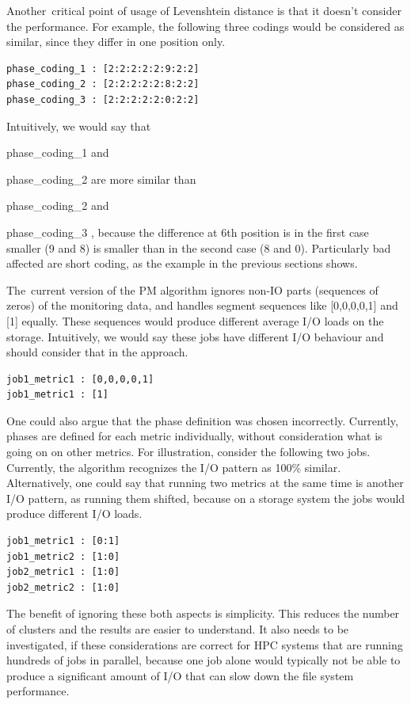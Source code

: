 \documentclass[]{llncs}
\begin{document}
Another\ critical point of usage of Levenshtein distance is that it doesn't consider the performance.
For example, the following three codings would be considered as similar, since they differ in one position only.

\begin{lstlisting}
phase_coding_1 : [2:2:2:2:2:9:2:2]
phase_coding_2 : [2:2:2:2:2:8:2:2]
phase_coding_3 : [2:2:2:2:2:0:2:2]
\end{lstlisting}

Intuitively, we would say that {phase\_coding\_1 and{ phase\_coding\_2 are more similar than {phase\_coding\_2 and {phase\_coding\_3 , because the difference at 6th position is in the first case smaller (9 and 8) is smaller than in the second case (8 and 0).
Particularly bad affected are short coding, as the example in the previous sections shows.

The\ current version of the PM algorithm ignores non-IO parts (sequences of zeros) of the monitoring data, and  handles segment sequences like [0,0,0,0,1] and [1] equally.
These sequences would produce different average I/O loads on the storage.
Intuitively, we would say these jobs have different I/O behaviour and should consider that in the approach.

\begin{lstlisting}
job1_metric1 : [0,0,0,0,1]
job1_metric1 : [1]
\end{lstlisting}

One could also argue that the phase definition was chosen incorrectly.
Currently, phases are defined for each metric individually, without consideration what is going on on other metrics.
For illustration, consider the following two jobs.
Currently, the algorithm recognizes the I/O pattern as 100$\%$  similar.
Alternatively, one could say that running two metrics at the same time is another I/O pattern, as running them shifted, because on a storage system the jobs would produce different I/O loads.

\begin{lstlisting}
job1_metric1 : [0:1]
job1_metric2 : [1:0]
job2_metric1 : [1:0]
job2_metric2 : [1:0]
\end{lstlisting}

The benefit of ignoring these both aspects is simplicity.
This reduces the number of clusters and the results are easier to understand.
It also needs to be investigated, if these considerations are correct for HPC systems that are running hundreds of jobs in parallel, because one job alone would typically not be able to produce a significant amount of I/O that can slow down the file system performance.

}}}}
\end{document}
